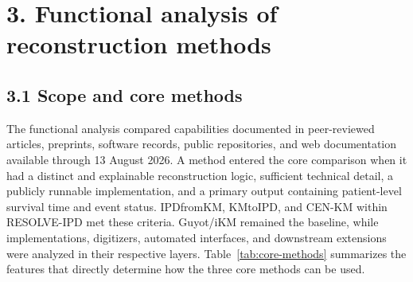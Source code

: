 \documentclass[10pt,letterpaper]{article}
\begin{document}
\section*{3. Functional analysis of reconstruction methods}

\subsection*{3.1 Scope and core methods}

The functional analysis compared capabilities documented in peer-reviewed articles, preprints, software records, public repositories, and web documentation available through 13 August 2026. A method entered the core comparison when it had a distinct and explainable reconstruction logic, sufficient technical detail, a publicly runnable implementation, and a primary output containing patient-level survival time and event status. IPDfromKM, KMtoIPD, and CEN-KM within RESOLVE-IPD met these criteria. Guyot/iKM remained the baseline, while implementations, digitizers, automated interfaces, and downstream extensions were analyzed in their respective layers. Table~\ref{tab:core-methods} summarizes the features that directly determine how the three core methods can be used.
\end{document}
